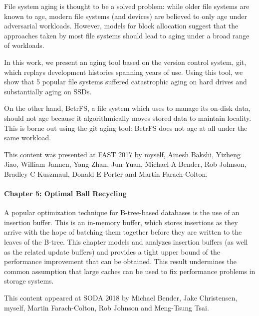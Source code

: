 File system aging is thought to be a solved problem: while older file systems
are known to age, modern file systems (and devices) are believed to only age
under adversarial workloads. However, models for block allocation suggest that
the approaches taken by most file systems should lead to aging under a broad
range of workloads.

In this work, we present an aging tool based on the version control system,
git, which replays development histories spanning years of use.  Using this
tool, we show that 5 popular file systems suffered catastrophic aging on hard
drives and substantially aging on SSDs.

On the other hand, BetrFS, a file system which uses \bets to manage its on-disk
data, should not age because it algorithmically moves stored data to maintain
locality. This is borne out using the git aging tool: BetrFS does not age at
all under the same workload.

This content was presented at FAST 2017 by myself, Ainesh Bakshi, Yizheng Jiao,
William Jannen, Yang Zhan, Jun Yuan, Michael A Bender, Rob Johnson, Bradley C
Kuszmaul, Donald E Porter and Mart\'in Farach-Colton.

\paragraph{Chapter 5: Optimal Ball Recycling}

A popular optimization technique for B-tree-based databases is the use of an
insertion buffer. This is an in-memory buffer, which stores insertions as they
arrive with the hope of batching them together before they are written to the
leaves of the B-tree. This chapter models and analyzes insertion buffers (as
well as the related update buffers) and provides a tight upper bound of the
performance improvement that can be obtained. This result undermines the common
assumption that large caches can be used to fix performance problems in storage
systems.

This content appeared at SODA 2018 by Michael Bender, Jake Christensen, myself,
Martin Farach-Colton, Rob Johnson and Meng-Tsung Tsai.
